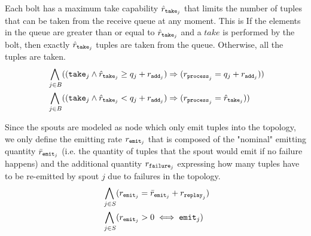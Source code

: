 Each bolt has a maximum take capability $\hat{r}_{\mathtt{take}_{j}}$ that limits the number of tuples that can be taken from the receive queue at any moment. This is 
If the elements in the queue are greater than or equal to $\hat{r}_{\mathtt{take}_{j}}$ and a $take$ is performed by the bolt, then exactly $\hat{r}_{\mathtt{take}_{j}}$ tuples are taken from the queue. Otherwise, all the tuples are taken. 
\begin{align*}
%
%
& \bigwedge_{
\begin{subarray}{c}
\,j \in B
\end{subarray}
}((\ta{j} \land \rth{j} \geq q_j + \ra{j}) \Rightarrow (\rp{j} = q_j + \ra{j})) \\
%
%
%
%
& \bigwedge_{
\begin{subarray}{c}
\,j \in B
\end{subarray}
}((\ta{j} \land \rth{j} < q_j + \ra{j}) \Rightarrow (\rp{j} = \rth{j}))
%
%
\end{align*}

Since the spouts are modeled as node which only emit tuples into the topology, we only define the emitting rate $r_{\mathtt{emit}_{j}}$  that is composed of the "nominal" emitting quantity $\bar{r}_{\mathtt{emit}_{j}}$ (i.e. the quantity of tuples that the spout would emit if no failure happens) and the additional quantity $r_{\mathtt{failure}_{j}}$ expressing how many tuples have to be re-emitted by spout $j$ due to failures in the topology.
\begin{align*}
%
& \bigwedge_{
\begin{subarray}{c}
\,j \in S\\
\end{subarray}
} ( \re{j} = \reb{j} + \rr{j}) \\
%
%
& \bigwedge_{
\begin{subarray}{c}
\,j \in S\\
\end{subarray}
} ( \re{j} > 0 \iff \e{j}) \\
%
%
\end{align*}






